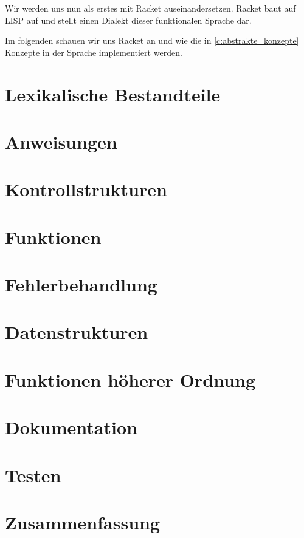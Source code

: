 Wir werden uns nun als erstes mit Racket auseinandersetzen. Racket baut auf LISP auf und stellt einen Dialekt dieser funktionalen Sprache dar.

Im folgenden schauen wir uns Racket an und wie die in \ref{c:abstrakte_konzepte} Konzepte in der Sprache implementiert werden.

\section{Lexikalische Bestandteile}
	

\section{Anweisungen}
	

\section{Kontrollstrukturen}
	

\section{Funktionen}
	

\section{Fehlerbehandlung}
	

\section{Datenstrukturen}
	

\section{Funktionen höherer Ordnung}
	

\section{Dokumentation}
	

\section{Testen}
	

\section{Zusammenfassung}
	
